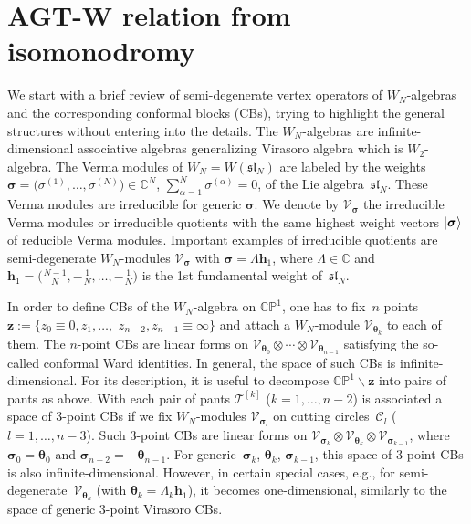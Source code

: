\documentclass[pdftex]{sigma}
\newcommand{\bs}{\boldsymbol}
\numberwithin{equation}{section}
\begin{document}
\section{AGT-W relation from isomonodromy}\label{appendixA}
We start with a brief review of semi-degenerate vertex operators of $W_N$-algebras and the corresponding conformal blocks (CBs), trying to highlight the general structures without entering into the details. The $W_N$-algebras are infinite-dimensional associative algebras generalizing Virasoro algebra which is $W_2$-algebra. The Verma modules of $W_N=W(\mathfrak{sl}_N)$ are labeled by the weights $\bs \sigma=\big(\sigma^{(1)},\ldots,\sigma^{(N)}\big)\in \mathbb{C}^N$, $\sum\limits_{\alpha=1}^N \sigma^{(\alpha)}=0$, of the Lie algebra~$\mathfrak{sl}_N$. These Verma modules are irreducible for generic $\bs\sigma$. We denote by $\mathcal{V}_{\bs \sigma}$ the irreducible Verma modules or irreducible quotients with the same highest weight vectors $ |\bs\sigma \ra$ of reducible Verma modules. Important examples of irreducible quotients are semi-degenerate $W_N$-modules $\mathcal{V}_{\bs \sigma}$ with $\bs\sigma=\Lambda \bs h_1$, where $\Lambda\in \mathbb{C}$ and $\bs h_1=\big(\frac{N-1}{N},-\frac1N,\ldots,-\frac1N\big)$ is the 1st fundamental weight of~$\mathfrak{sl}_N$.

In order to define CBs of the $W_N$-algebra on $\mathbb{CP}^1$, one has to fix~$n$ points $\bs z:=\{z_0\equiv0,z_1,\ldots,$ $z_{n-2},z_{n-1}\equiv\infty\}$ and attach a $W_N$-module $\mathcal{V}_{\bs \theta_k}$ to each of them. The $n$-point CBs are linear forms on ${\mathcal V}_{\bs \theta_0}\otimes \cdots \otimes {\mathcal V}_{\bs \theta_{n-1}}$ satisfying the so-called conformal Ward identities. In general, the space of such CBs is infinite-dimensional. For its description, it is useful to decompose $\mathbb{CP}^1\backslash{\bs z}$ into pairs of pants as above. With each pair of pants $\mathcal T^{[k]}$ ($k=1,\ldots,n-2$) is associated a space of $3$-point CBs if we fix $W_N$-modules $\mathcal{V}_{\bs \sigma_l}$ on cutting circles~$\mathcal{C}_l$ ($l=1,\ldots,n-3$). Such $3$-point CBs are linear forms on $\mathcal{V}_{\bs \sigma_k}\otimes \mathcal{V}_{\bs \theta_k} \otimes \mathcal{V}_{\bs \sigma_{k-1}}$, where $\bs\sigma_0=\bs\theta_0$ and $\bs\sigma_{n-2}=-\bs\theta_{n-1}$. For generic~${\bs \sigma_k}$, ${\bs \theta_k}$, ${\bs \sigma_{k-1}}$, this space of $3$-point CBs is also infinite-dimensional. However, in certain special cases, e.g., for semi-degenerate~$\mathcal{V}_{\bs \theta_k}$ (with $\bs \theta_k=\Lambda_k \bs h_1$), it becomes one-dimensional, similarly to the space of generic $3$-point Virasoro CBs.
\end{document}
